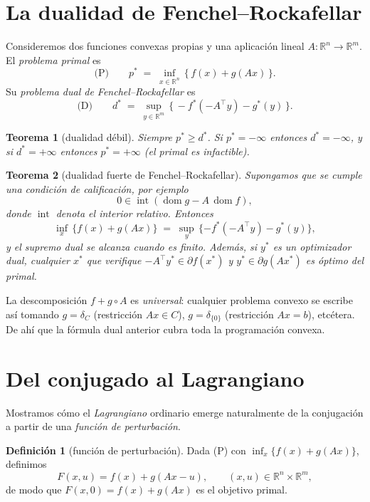 \documentclass[12pt]{book}
\newcommand{\R}{\mathbb{R}}
\newcommand{\dom}{\operatorname{dom}}
\newcommand{\ri}{\operatorname{int}}
\newcommand{\subdiff}{\partial}
\newcommand{\indic}{\delta}
\theoremstyle{definition}
\newtheorem{definicion}{Definición}[section]
\theoremstyle{plain}
\newtheorem{teorema}{Teorema}[section]
\theoremstyle{remark}
\begin{document}
\section{La dualidad de Fenchel--Rockafellar}\label{sec:dual}

Consideremos dos funciones convexas propias y una aplicación lineal
$A:\R^n\to\R^m$.  El \emph{problema primal} es
\[
  \text{(P)}\qquad p^* \;=\; \inf_{x\in\R^n}\,\bigl\{\, f(x) + g(Ax)\,\bigr\}.
\]
Su \emph{problema dual de Fenchel--Rockafellar} es
\[
  \text{(D)}\qquad d^* \;=\; \sup_{y\in\R^m}\,\bigl\{\, -f^*(-A^{\!\top} y) - g^*(y)\,\bigr\}.
\]

\begin{teorema}[dualidad débil]
  Siempre $p^*\ge d^*$.  Si $p^*=-\infty$ entonces $d^*=-\infty$, y si
  $d^*=+\infty$ entonces $p^*=+\infty$ (el primal es infactible).
\end{teorema}

\begin{teorema}[dualidad fuerte de Fenchel--Rockafellar]
  Supongamos que se cumple una \emph{condición de calificación}, por
  ejemplo
  \[
    0\in\ri(\dom g - A\,\dom f),
  \]
  donde $\ri$ denota el interior relativo.  Entonces
  \[
    \boxed{\;
    \inf_{x}\,\{f(x)+g(Ax)\}
    \;=\;
    \sup_{y}\,\{-f^*(-A^{\!\top} y)-g^*(y)\},
    \;}
  \]
  y el supremo dual se alcanza cuando es finito.  Además, si $y^*$ es
  un optimizador dual, cualquier $x^*$ que verifique
  $-A^{\!\top}y^*\in\subdiff f(x^*)$ y $y^*\in\subdiff g(Ax^*)$
  es óptimo del primal.
\end{teorema}

La descomposición $f+g\circ A$ es \emph{universal}: cualquier
problema convexo se escribe así tomando
$g=\indic_C$ (restricción $Ax\in C$), $g=\indic_{\{0\}}$ (restricción
$Ax=b$), etcétera.  De ahí que la fórmula dual anterior cubra
toda la programación convexa.

\section{Del conjugado al Lagrangiano}\label{sec:lagr}

Mostramos cómo el \emph{Lagrangiano} ordinario emerge naturalmente
de la conjugación a partir de una \emph{función de perturbación}.

\begin{definicion}[función de perturbación]
  Dada (P) con $\inf_x\{f(x)+g(Ax)\}$, definimos
  \[
    F(x,u)=f(x)+g(Ax-u),\qquad (x,u)\in\R^n\times\R^m,
  \]
  de modo que $F(x,0)=f(x)+g(Ax)$ es el objetivo primal.
\end{definicion}
\end{document}
